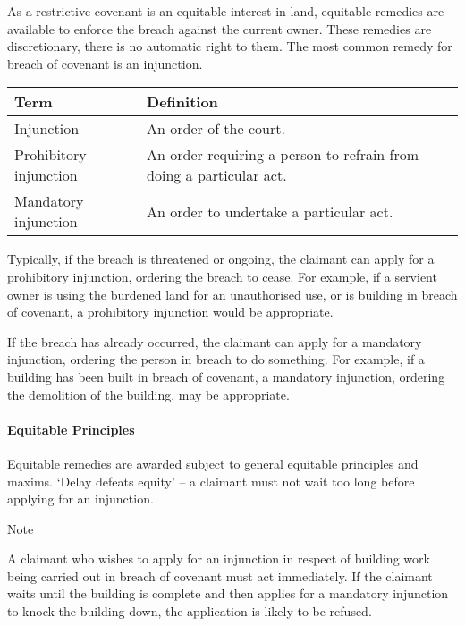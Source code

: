 \documentclass[
]{article}
\newenvironment{env-881a4bd6-779e-4404-ae5b-86f77846f864}
{
    \savenotes\tcolorbox[blanker,breakable,left=5pt,borderline west={2pt}{-4pt}{blue}]
}
{
    \endtcolorbox\spewnotes
}
\begin{document}
As a restrictive covenant is an equitable interest in land, equitable
remedies are available to enforce the breach against the current owner.
These remedies are discretionary, there is no automatic right to them.
The most common remedy for breach of covenant is an injunction.

\begin{longtable}[]{@{}ll@{}}
\toprule()
Term & Definition \\
\midrule()
\endhead
Injunction & An order of the court. \\
Prohibitory injunction & An order requiring a person to refrain from
doing a particular act. \\
Mandatory injunction & An order to undertake a particular act. \\
\bottomrule()
\end{longtable}

Typically, if the breach is threatened or ongoing, the claimant can
apply for a prohibitory injunction, ordering the breach to cease. For
example, if a servient owner is using the burdened land for an
unauthorised use, or is building in breach of covenant, a prohibitory
injunction would be appropriate.

If the breach has already occurred, the claimant can apply for a
mandatory injunction, ordering the person in breach to do something. For
example, if a building has been built in breach of covenant, a mandatory
injunction, ordering the demolition of the building, may be appropriate.

\hypertarget{equitable-principles}{%
\paragraph{Equitable Principles}\label{equitable-principles}}

Equitable remedies are awarded subject to general equitable principles
and maxims. `Delay defeats equity' -- a claimant must not wait too long
before applying for an injunction.

\begin{env-881a4bd6-779e-4404-ae5b-86f77846f864}

Note

A claimant who wishes to apply for an injunction in respect of building
work being carried out in breach of covenant must act immediately. If
the claimant waits until the building is complete and then applies for a
mandatory injunction to knock the building down, the application is
likely to be refused.

\end{env-881a4bd6-779e-4404-ae5b-86f77846f864}
\end{document}
